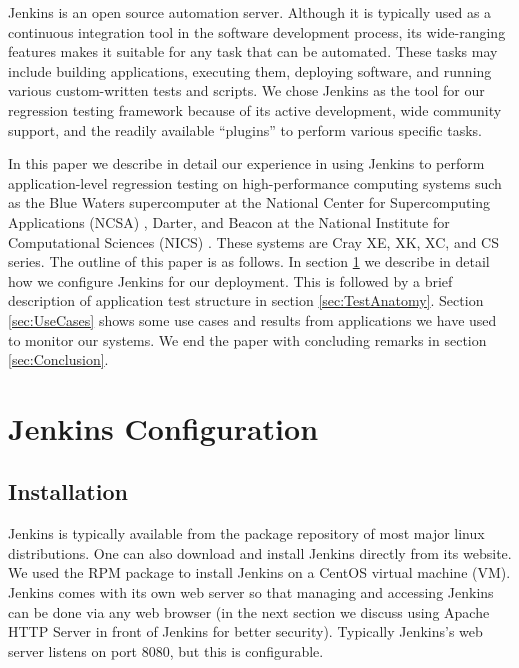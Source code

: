 \documentclass[10pt, conference, compsocconf]{IEEEtran}
\begin{document}
Jenkins is an open source automation server. 
Although it is typically used as a continuous integration tool in the software development process, its wide-ranging features makes it suitable for any task that can be automated. 
These tasks may include building applications, executing them, deploying software, and running various custom-written tests and scripts. 
We chose Jenkins as the tool for our regression testing framework because of its active development, wide community support, and the readily available ``plugins'' to perform various specific tasks.

In this paper we describe in detail our experience in using Jenkins to perform application-level regression testing on high-performance computing systems such as the Blue Waters supercomputer at the National Center for Supercomputing Applications (NCSA) \cite{NCSA}, Darter, and Beacon at the National Institute for Computational Sciences (NICS) \cite{NICS}. 
These systems are Cray XE, XK, XC, and CS series. 
The outline of this paper is as follows. In section \ref{sec:JenkinsConfiguration} we describe in detail how we configure Jenkins for our deployment. This is followed by a brief description of application test structure in section \ref{sec:TestAnatomy}. Section \ref{sec:UseCases} shows some use cases and results from applications we have used to monitor our systems. We end the paper with concluding remarks in section \ref{sec:Conclusion}.


\section{Jenkins Configuration}
\label{sec:JenkinsConfiguration}

\subsection{Installation}
Jenkins is typically available from the package repository of most major linux distributions. 
One can also download and install Jenkins directly from its website. 
We used the RPM package to install Jenkins on a CentOS virtual machine (VM). 
Jenkins comes with its own web server so that managing and accessing Jenkins can be done via any web browser (in the next section we discuss using Apache HTTP Server in front of Jenkins for better security). 
Typically Jenkins's web server listens on port 8080, but this is configurable. 
\end{document}
